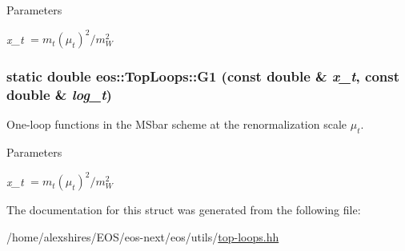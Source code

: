 \begin{DoxyParams}{Parameters}
\item[{\em x\_\-t}]$= m_t(\mu_t)^2 / m_W^2$ \end{DoxyParams}
\hypertarget{structeos_1_1TopLoops_a6a9e91edbf04928ccb3fa47b25de78ed}{
\subsubsection[{G1}]{\setlength{\rightskip}{0pt plus 5cm}static double eos::TopLoops::G1 (const double \& {\em x\_\-t}, \/  const double \& {\em log\_\-t})}}
\label{structeos_1_1TopLoops_a6a9e91edbf04928ccb3fa47b25de78ed}
One-\/loop functions in the MSbar scheme at the renormalization scale $\mu_t$.


\begin{DoxyParams}{Parameters}
\item[{\em x\_\-t}]$= m_t(\mu_t)^2 / m_W^2$ \end{DoxyParams}


The documentation for this struct was generated from the following file:\begin{DoxyCompactItemize}
\item 
/home/alexshires/EOS/eos-\/next/eos/utils/\hyperlink{top-loops_8hh}{top-\/loops.hh}\end{DoxyCompactItemize}
